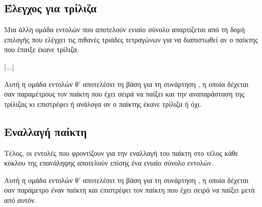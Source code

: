 \documentclass[a4paper,11pt,oneside]{book}
\begin{document}

\subsection{Έλεγχος για τρίλιζα}

Μια άλλη ομάδα εντολών που αποτελούν ενιαίο σύνολο απαρτίζεται από τη  δομή επιλογής που ελέγχει τις πιθανές τριάδες τετραγώνων για να διαπιστωθεί αν ο παίκτης που έπαιξε έκανε τρίλιζα.

\begin{pyplain}
    |...|
\end{pyplain}

Αυτή η ομάδα εντολών θ' αποτελέσει τη βάση για τη συνάρτηση , η οποία δέχεται σαν παραμέτρους τον παίκτη  που έχει σειρά να παίξει και την αναπαράσταση  της τρίλιζας κι επιστρέφει  ή  ανάλογα αν ο παίκτης έκανε τρίλιζα ή όχι.


\subsection{Εναλλαγή παίκτη}

Τέλος, οι εντολές που φροντίζουν για την εναλλαγή του παίκτη στο τέλος κάθε κύκλου της επανάληψης αποτελούν επίσης ένα ενιαίο σύνολο εντολών.


Αυτή η ομάδα εντολών θ' αποτελέσει τη βάση για τη συνάρτηση , η οποία δέχεται σαν παράμετρο έναν παίκτη  και επιστρέφει τον παίκτη που έχει σειρά να παίξει μετά από αυτόν.


\end{document}
